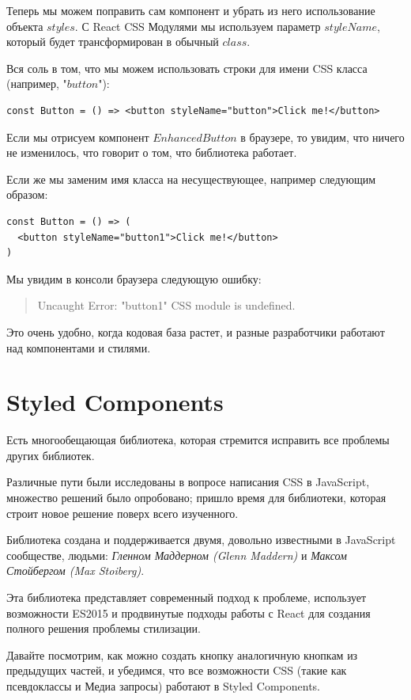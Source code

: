 Теперь мы можем поправить сам компонент и убрать из него использование объекта $styles$. С React CSS Модулями мы используем параметр $styleName$, который будет трансформирован в обычный $class$.

Вся соль в том, что мы можем использовать строки для имени CSS класса (например, "$button$"):

\begin{lstlisting}
const Button = () => <button styleName="button">Click me!</button>
\end{lstlisting}

Если мы отрисуем компонент $EnhancedButton$ в браузере, то увидим, что ничего не изменилось, что говорит о том, что библиотека работает.

Если же мы заменим имя класса на несуществующее, например следующим образом:

\begin{lstlisting}
const Button = () => (
  <button styleName="button1">Click me!</button>
)
\end{lstlisting}

Мы увидим в консоли браузера следующую ошибку:

\begin{quotation}
Uncaught Error: "button1" CSS module is undefined.
\end{quotation}

Это очень удобно, когда кодовая база растет, и разные разработчики работают над компонентами и стилями.

\section{Styled Components}

Есть многообещающая библиотека, которая стремится исправить все проблемы других библиотек.

Различные пути были исследованы в вопросе написания CSS в JavaScript, множество решений было опробовано; пришло время для библиотеки, которая строит новое решение поверх всего изученного.

Библиотека создана и поддерживается двумя, довольно известными в JavaScript сообществе, людьми: \textit{Гленном Маддерном (Glenn Maddern)} и \textit{Максом Стойбергом (Max Stoiberg)}.

Эта библиотека представляет современный подход к проблеме, использует возможности ES2015 и продвинутые подходы работы с React для создания полного решения проблемы стилизации.

Давайте посмотрим, как можно создать кнопку аналогичную кнопкам из предыдущих частей, и убедимся, что все возможности CSS (такие как псевдоклассы и Медиа запросы) работают в Styled Components.

